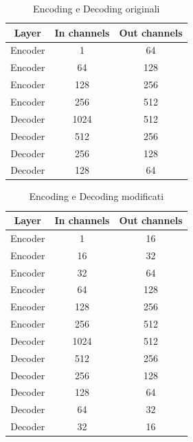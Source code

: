 \begin{table}[!ht]
	\centering
	\begin{tabular}{|c|c|c|}
		\hline
		\textbf{Layer} & \textbf{In channels} & \textbf{Out channels} \\
		\hline
		\hline
		Encoder        & 1                    & 64                    \\
		\hline
		Encoder        & 64                   & 128                   \\
		\hline
		Encoder        & 128                  & 256                   \\
		\hline
		Encoder        & 256                  & 512                   \\
		\hline
		Decoder        & 1024                 & 512                   \\
		\hline
		Decoder        & 512                  & 256                   \\
		\hline
		Decoder        & 256                  & 128                   \\
		\hline
		Decoder        & 128                  & 64                    \\
		\hline
	\end{tabular}
	\caption{Encoding e Decoding originali}
	\label{tab:encoding_originale}
\end{table}

\begin{table}[!ht]
	\centering
	\begin{tabular}{|c|c|c|}
		\hline
		\textbf{Layer} & \textbf{In channels} & \textbf{Out channels} \\
		\hline
		\hline
		Encoder        & 1                    & 16                    \\
		\hline
		Encoder        & 16                   & 32                    \\
		\hline
		Encoder        & 32                   & 64                    \\
		\hline
		Encoder        & 64                   & 128                   \\
		\hline
		Encoder        & 128                  & 256                   \\
		\hline
		Encoder        & 256                  & 512                   \\
		\hline
		Decoder        & 1024                 & 512                   \\
		\hline
		Decoder        & 512                  & 256                   \\
		\hline
		Decoder        & 256                  & 128                   \\
		\hline
		Decoder        & 128                  & 64                    \\
		\hline
		Decoder        & 64                   & 32                    \\
		\hline
		Decoder        & 32                   & 16                    \\
		\hline
	\end{tabular}
	\caption{Encoding e Decoding modificati}
	\label{tab:encoding_modificato}
\end{table}

